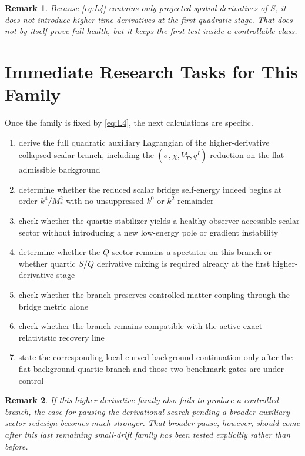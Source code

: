 \documentclass[11pt]{article}
\newtheorem{remark}{Remark}
\begin{document}
\begin{remark}
Because \eqref{eq:L4} contains only projected spatial derivatives of \(S\), it does not introduce higher time derivatives at the first quadratic stage. That does not by itself prove full health, but it keeps the first test inside a controllable class.
\end{remark}

\section{Immediate Research Tasks for This Family}

Once the family is fixed by \eqref{eq:L4}, the next calculations are specific.
\begin{enumerate}
    \item derive the full quadratic auxiliary Lagrangian of the higher-derivative collapsed-scalar branch, including the \((\sigma,\chi,V_T^i,q^I)\) reduction on the flat admissible background
    \item determine whether the reduced scalar bridge self-energy indeed begins at order \(k^4/M_*^2\) with no unsuppressed \(k^0\) or \(k^2\) remainder
    \item check whether the quartic stabilizer yields a healthy observer-accessible scalar sector without introducing a new low-energy pole or gradient instability
    \item determine whether the \(Q\)-sector remains a spectator on this branch or whether quartic \(S/Q\) derivative mixing is required already at the first higher-derivative stage
    \item check whether the branch preserves controlled matter coupling through the bridge metric alone
    \item check whether the branch remains compatible with the active exact-relativistic recovery line
    \item state the corresponding local curved-background continuation only after the flat-background quartic branch and those two benchmark gates are under control
\end{enumerate}

\begin{remark}
If this higher-derivative family also fails to produce a controlled branch, the case for pausing the derivational search pending a broader auxiliary-sector redesign becomes much stronger. That broader pause, however, should come after this last remaining small-drift family has been tested explicitly rather than before.
\end{remark}
\end{document}
